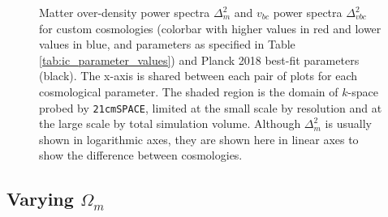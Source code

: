 \documentclass[floats,floatfix,showpacs,amssymb,prd,superscriptaddress,nofootinbib, 11pt]{revtex4-2} %
\newcommand{\code}{\texttt}
\begin{document}
\begin{figure}[H]
\begin{subfigure}[b]{0.9\textwidth}
     \end{subfigure}
        \caption{Matter over-density power spectra $\Delta_m^2$ and $v_{bc}$ power spectra $\Delta_{vbc}^2$ for custom cosmologies (colorbar with higher values in red and lower values in blue, and parameters as specified in Table \ref{tab:ic_parameter_values}) and Planck 2018 best-fit parameters (black). The x-axis is shared between each pair of plots for each cosmological parameter. The shaded region is the domain of $k$-space probed by \code{21cmSPACE}, limited at the small scale by resolution and at the large scale by total simulation volume. Although $\Delta_m^2$ is usually shown in logarithmic axes, they are shown here in linear axes to show the difference between cosmologies.}
        \label{fig:averaged_IC_power_spectra}
\end{figure}


\subsection{Varying $\Omega_m$}
\end{document}
